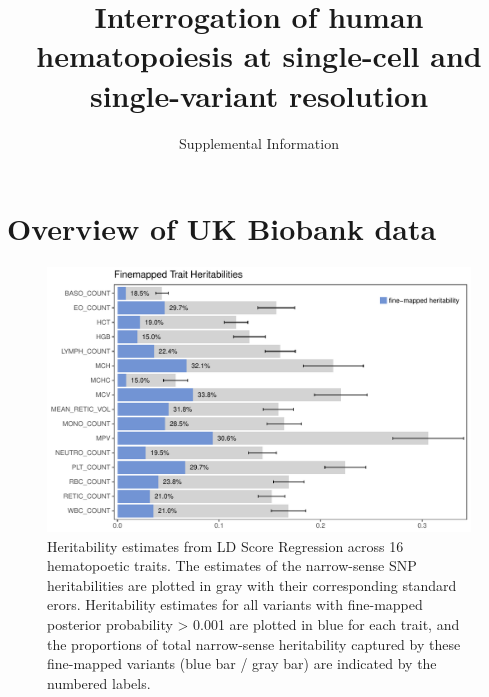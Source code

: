 \documentclass{article}\usepackage[]{graphicx}\usepackage[]{color}
\title{Interrogation of human hematopoiesis at single-cell and single-variant resolution}
\date{Supplemental Information}
\author{ }
\makeatletter
\def\maxwidth{ %
  \ifdim\Gin@nat@width>\linewidth
    \linewidth
  \else
    \Gin@nat@width
  \fi
}
\newenvironment{knitrout}{}{} %
\makeatother
\begin{document}
\maketitle
\section*{Overview of UK Biobank data}




\begin{knitrout}
\color{fgcolor}\begin{figure}[H]

{\centering \includegraphics[width=\maxwidth]{figure/heritabilityPlots-1} 

}

\caption[Heritability estimates from LD Score Regression across 16 hematopoetic traits]{Heritability estimates from LD Score Regression across 16 hematopoetic traits. The estimates of the narrow-sense SNP heritabilities are plotted in gray with their corresponding standard erors. Heritability estimates for all variants with fine-mapped posterior probability > 0.001 are plotted in blue for each trait, and the proportions of total narrow-sense heritability captured by these fine-mapped variants (blue bar / gray bar) are indicated by the numbered labels.}\label{fig:heritabilityPlots}
\end{figure}


\end{knitrout}
\end{document}
